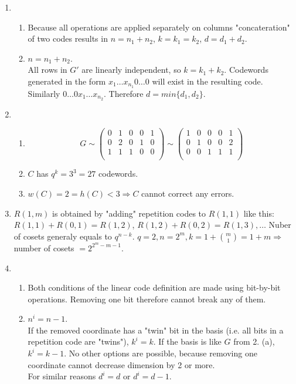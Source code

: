 \documentclass[a4paper,9pt]{extarticle}
\begin{document}
\begin{enumerate}
\begin{enumerate}
    \end{enumerate}
  \item
    \begin{enumerate}
      \item
        Because all operations are applied separately on columns "concateration" of two codes results in $n=n_1+n_2$, $k=k_1=k_2$, $d=d_1+d_2$.
      \item
        $n=n_1+n_2$.\\
        All rows in $G'$ are linearly independent, so $k=k_1+k_2$.
        Codewords generated in the form $x_1\dots x_{n_1}0\dots 0$ will exist in the resulting code. 
        Similarly $0\dots 0x_1\dots x_{n_2}$. Therefore $d=min\{d_1, d_2\}$.
    \end{enumerate}
  \item
    \begin{enumerate}
      \item
        \[
          G\sim
          \begin{pmatrix}
            0&1&0&0&1\\
            0&2&0&1&0\\
            1&1&1&0&0\\
          \end{pmatrix}
          \sim
          \begin{pmatrix}
            1&0&0&0&1\\
            0&1&0&0&2\\
            0&0&1&1&1\\
          \end{pmatrix}
        \]
      \item
        $C$ has $q^k=3^3=27$ codewords.
      \item
        $w(C)=2=h(C)<3\Rightarrow C$ cannot correct any errors.
        
    \end{enumerate}

  \item
    $R(1,m)$ is obtained by "adding" repetition codes to $R(1,1)$ like this: $R(1,1)+R(0,1)=R(1,2)$, $R(1,2)+R(0,2)=R(1,3), \dots$
    Nuber of cosets generaly equals to $q^{n-k}$. $q=2, n=2^m, k=1+\binom{m}{1}=1+m\Rightarrow$ number of cosets $=2^{2^m-m-1}$.
  \item
    \begin{enumerate}
      \item
        Both conditions of the linear code definition are made using bit-by-bit operations. Removing one bit therefore cannot break any of them.
      \item
        $n^i=n-1$.\\
        If the removed coordinate has a "twin" bit in the basis (i.e. all bits in a repetition code are "twins"), $k^i=k$.
        If the basis is like $G$ from 2. (a),$k^i=k-1$. No other options are possible, because removing one coordinate cannot decrease dimension by 2 or more.\\
        For similar reasons $d^i=d$ or $d^i=d-1$.
        

\end{enumerate}
\end{enumerate}
\end{document}
